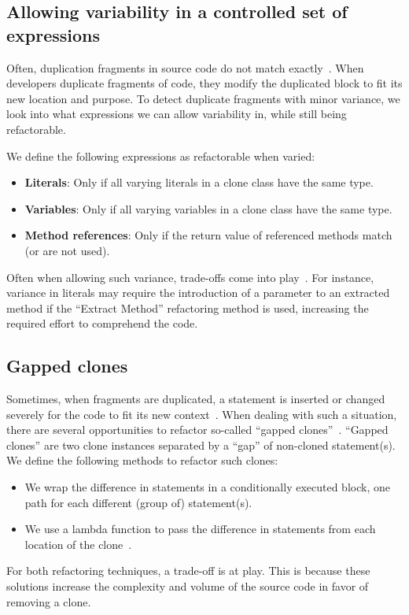 \documentclass[sigconf,review, table]{acmart}
\begin{document}
\subsection{Allowing variability in a controlled set of expressions} \label{sec:t2r}
Often, duplication fragments in source code do not match exactly~\cite{kodhai2013method}. When developers duplicate fragments of code, they modify the duplicated block to fit its new location and purpose. To detect duplicate fragments with minor variance, we look into what expressions we can allow variability in, while still being refactorable.

We define the following expressions as refactorable when varied:
\begin{itemize}
  \item \textbf{Literals}: Only if all varying literals in a clone class have the same type.
  \item \textbf{Variables}: Only if all varying variables in a clone class have the same type.
  \item \textbf{Method references}: Only if the return value of referenced methods match (or are not used).
\end{itemize}
Often when allowing such variance, trade-offs come into play~\cite{krishnan2013refactoring, krishnan2014unification}. For instance, variance in literals may require the introduction of a parameter to an extracted method if the ``Extract Method'' refactoring method is used, increasing the required effort to comprehend the code.

\subsection{Gapped clones} \label{sec:t3r}
Sometimes, when fragments are duplicated, a statement is inserted or changed severely for the code to fit its new context~\cite{roy2007survey}. When dealing with such a situation, there are several opportunities to refactor so-called ``gapped clones''~\cite{ueda2002detection, zhao2018automatic}. ``Gapped clones'' are two clone instances separated by a ``gap'' of non-cloned statement(s). We define the following methods to refactor such clones:
\begin{itemize}
  \item We wrap the difference in statements in a conditionally executed block, one path for each different (group of) statement(s).
  \item We use a lambda function to pass the difference in statements from each location of the clone~\cite{tsantalis2017clone}.
\end{itemize}
For both refactoring techniques, a trade-off is at play. This is because these solutions increase the complexity and volume of the source code in favor of removing a clone.
\end{document}
